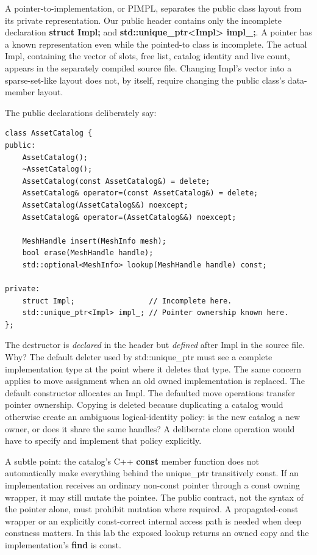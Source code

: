 A pointer-to-implementation, or PIMPL, separates the public class layout from its private representation. Our public header contains only the incomplete declaration \textbf{struct Impl;} and \textbf{std::unique\_ptr\textless Impl\textgreater{} impl\_;}. A pointer has a known representation even while the pointed-to class is incomplete. The actual Impl, containing the vector of slots, free list, catalog identity and live count, appears in the separately compiled source file. Changing Impl's vector into a sparse-set-like layout does not, by itself, require changing the public class's data-member layout.

The public declarations deliberately say:

\begin{verbatim}
class AssetCatalog {
public:
    AssetCatalog();
    ~AssetCatalog();
    AssetCatalog(const AssetCatalog&) = delete;
    AssetCatalog& operator=(const AssetCatalog&) = delete;
    AssetCatalog(AssetCatalog&&) noexcept;
    AssetCatalog& operator=(AssetCatalog&&) noexcept;

    MeshHandle insert(MeshInfo mesh);
    bool erase(MeshHandle handle);
    std::optional<MeshInfo> lookup(MeshHandle handle) const;

private:
    struct Impl;                 // Incomplete here.
    std::unique_ptr<Impl> impl_; // Pointer ownership known here.
};
\end{verbatim}

The destructor is \emph{declared} in the header but \emph{defined} after Impl in the source file. Why? The default deleter used by std::unique\_ptr must see a complete implementation type at the point where it deletes that type. The same concern applies to move assignment when an old owned implementation is replaced. The default constructor allocates an Impl. The defaulted move operations transfer pointer ownership. Copying is deleted because duplicating a catalog would otherwise create an ambiguous logical-identity policy: is the new catalog a new owner, or does it share the same handles? A deliberate clone operation would have to specify and implement that policy explicitly.

A subtle point: the catalog's C++ \textbf{const} member function does not automatically make everything behind the unique\_ptr transitively const. If an implementation receives an ordinary non-const pointer through a const owning wrapper, it may still mutate the pointee. The public contract, not the syntax of the pointer alone, must prohibit mutation where required. A propagated-const wrapper or an explicitly const-correct internal access path is needed when deep constness matters. In this lab the exposed lookup returns an owned copy and the implementation's \textbf{find} is const.

